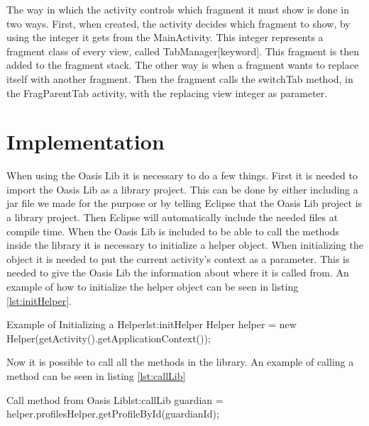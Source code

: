 The way in which the activity controls which fragment it must show is done in two ways. First, when created, the activity decides which fragment to show, by using the integer it gets from the MainActivity. This integer represents a fragment class of every view, called TabManager[keyword]. This fragment is then added to the fragment stack. The other way is when a fragment wants to replace itself with another fragment. Then the fragment calls the switchTab method, in the FragParentTab activity, with the replacing view integer as parameter.

\section{Implementation}
\label{sec:AppImp}
When using the Oasis Lib it is necessary to do a few things. First it is needed to import the Oasis Lib as a library project. This can be done by either including a jar file we made for the purpose or by telling Eclipse that the Oasis Lib project is a library project. Then Eclipse will automatically include the needed files at compile time.
When the Oasis Lib is included to be able to call the methods inside the library it is necessary to initialize a helper object. When initializing the object it is needed to put the current activity's context as a parameter. This is needed to give the Oasis Lib the information about where it is called from. An example of how to initialize the helper object can be seen in listing \vref{lst:initHelper}.

\begin{Java}{Example of Initializing a Helper}{lst:initHelper}
Helper helper = new Helper(getActivity().getApplicationContext());
\end{Java}

Now it is possible to call all the methods in the library. An example of calling a method can be seen in listing \vref{lst:callLib}

\begin{Java}{Call method from Oasis Lib}{lst:callLib}
guardian = helper.profilesHelper.getProfileById(guardianId);
\end{Java}